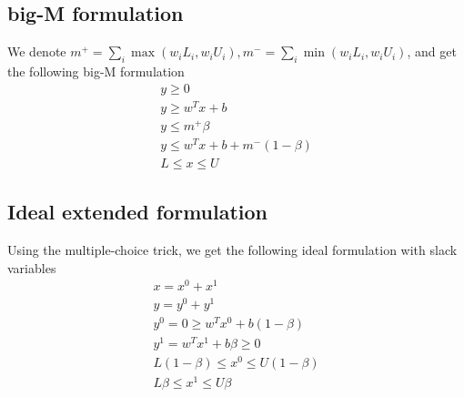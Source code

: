 \documentclass{article}
\begin{document}
\subsection{big-M formulation}
We denote $m^+ = \sum_i \max(w_iL_i, w_iU_i), m^- = \sum_i \min(w_iL_i, w_iU_i)$, and get the following big-M formulation
\begin{subequations}
\begin{align}
	y \ge 0\\
	y \ge w^Tx + b\\
	y \le m^+\beta\\
	y \le w^Tx+b + m^-(1-\beta)\\
	L \le x \le U
\end{align}
\end{subequations}
\subsection{Ideal extended formulation}
Using the multiple-choice trick, we get the following ideal formulation with slack variables
\begin{subequations}
\begin{align}
	x = x^0 + x^1\\
	y = y^0 + y^1\\
	y^0 = 0 \ge w^Tx^0 + b(1-\beta)\\
	y^1 = w^Tx^1 + b\beta\ge 0\\
	L(1-\beta)\le x^0\le U(1-\beta)\\
	L\beta\le x^1\le U\beta
\end{align}
\end{subequations}
\end{document}
